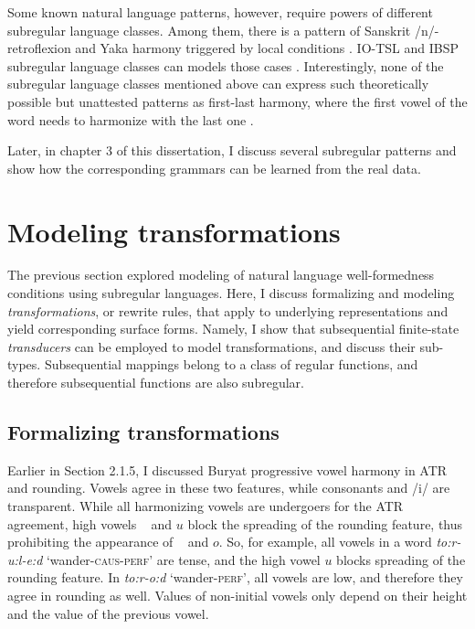 Some known natural language patterns, however, require powers of different subregular language classes.
Among them, there is a pattern of Sanskrit /n/-retroflexion and Yaka harmony triggered by local conditions \citep{Walker2000,McMullin2016,Karakas2020}.
IO-TSL and IBSP subregular language classes can models those cases \citep{Graf17Phonology,Graf18NELS}.
Interestingly, none of the subregular language classes mentioned above can express such theoretically possible but unattested patterns as first-last harmony, where the first vowel of the word needs to harmonize with the last one \citep{Lai15,Avcu2018}.


Later, in chapter 3 of this dissertation, I discuss several subregular patterns and show how the corresponding grammars can be learned from the real data.










\section{Modeling transformations}

The previous section explored modeling of natural language well-formedness conditions using subregular languages.
Here, I discuss formalizing and modeling \emph{transformations}, or rewrite rules, that apply to underlying representations and yield corresponding surface forms.
Namely, I show that subsequential finite-state \emph{transducers} can be employed to model transformations, and discuss their sub-types.
Subsequential mappings belong to a class of regular functions, and therefore subsequential functions are also subregular.

\subsection{Formalizing transformations}
\label{FSTforburyat}

Earlier in Section 2.1.5, I discussed Buryat progressive vowel harmony in ATR and rounding.
Vowels agree in these two features, while consonants and /i/ are transparent.
While all harmonizing vowels are undergoers for the ATR agreement, high vowels \textupsilon~ and $u$ block the spreading of the rounding feature, thus prohibiting the appearance of \textopeno~ and $o$.
So, for example, all vowels in a word \emph{to:r-u:l-e:d} `wander-\textsc{caus-perf}' are tense, and the high vowel $u$ blocks spreading of the rounding feature.
In \emph{to:r-o:d} `wander-\textsc{perf}', all vowels are low, and therefore they agree in rounding as well.
Values of non-initial vowels only depend on their height and the value of the previous vowel.

